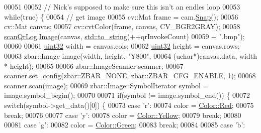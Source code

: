 \begin{DoxyCode}
00051 
00052         \textcolor{comment}{// Nick's supposed to make sure this isn't an endles loop}
00053         \textcolor{keywordflow}{while}(\textcolor{keyword}{true}) \{           
00054             \textcolor{comment}{// get image}
00055             cv::Mat frame = cam.\hyperlink{classChipChipArray_1_1PiCamera_a58fb0de02570dce9a9cb60a1a04fb84f}{Snap}();
00056             cv::Mat canvas;
00057             cv::cvtColor(frame, canvas, CV\_BGR2GRAY);
00058             \hyperlink{namespaceChipChipArray_ab5c6290951637c25a5422707020fb3a8}{scanQrLog}.\hyperlink{classChipChipArray_1_1Log_a65bbab057c8b1453f9e4efcfee7522c4}{Image}(canvas, \hyperlink{namespacestd_aa5ddf582a1c96ffe258c997be9a294a3}{std::to\_string}(++qrInvokeCount)
00059                     + \textcolor{stringliteral}{".bmp"});
00060             
00061             \hyperlink{definitions_8hpp_a1134b580f8da4de94ca6b1de4d37975e}{uint32} width = canvas.cols;
00062             \hyperlink{definitions_8hpp_a1134b580f8da4de94ca6b1de4d37975e}{uint32} height = canvas.rows;
00063             zbar::Image image(width, height, \textcolor{stringliteral}{"Y800"},
00064                     (uchar*)canvas.data, width * height);
00065 
00066             zbar::ImageScanner scanner;
00067             scanner.set\_config(zbar::ZBAR\_NONE, zbar::ZBAR\_CFG\_ENABLE, 1);
00068             scanner.scan(image);
00069             zbar::Image::SymbolIterator symbol = image.symbol\_begin();
00070 
00071             \textcolor{keywordflow}{if}(symbol != image.symbol\_end()) \{
00072                 \textcolor{keywordflow}{switch}(symbol->get\_data()[0]) \{
00073                     \textcolor{keywordflow}{case} \textcolor{charliteral}{'r'}:
00074                         color = \hyperlink{definitions_8hpp_abc05a0f46084a3477cf5d5c939ff1436aee38e4d5dd68c4e440825018d549cb47}{Color::Red};
00075                         \textcolor{keywordflow}{break};
00076 
00077                     \textcolor{keywordflow}{case} \textcolor{charliteral}{'y'}:
00078                         color = \hyperlink{definitions_8hpp_abc05a0f46084a3477cf5d5c939ff1436a51e6cd92b6c45f9affdc158ecca2b8b8}{Color::Yellow};
00079                         \textcolor{keywordflow}{break};
00080 
00081                     \textcolor{keywordflow}{case} \textcolor{charliteral}{'g'}:
00082                         color = \hyperlink{definitions_8hpp_abc05a0f46084a3477cf5d5c939ff1436ad382816a3cbeed082c9e216e7392eed1}{Color::Green};
00083                         \textcolor{keywordflow}{break};
00084 
00085                     \textcolor{keywordflow}{case} \textcolor{charliteral}{'b'}:

\end{DoxyCode}

